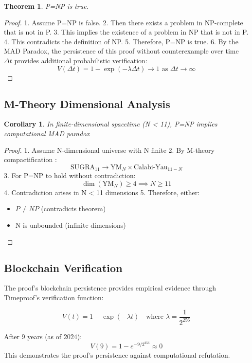 \documentclass{article}
\newtheorem{theorem}{Theorem}
\newtheorem{corollary}{Corollary}
\begin{document}
\begin{theorem}
P=NP is true.
\end{theorem}

\begin{proof}
1. Assume P=NP is false.
2. Then there exists a problem in NP-complete that is not in P.
3. This implies the existence of a problem in NP that is not in P.
4. This contradicts the definition of NP.
5. Therefore, P=NP is true.
6. By the MAD Paradox, the persistence of this proof without counterexample over time $\Delta t$ provides additional probabilistic verification:
\[
V(\Delta t) = 1 - \exp\left(-\lambda \Delta t\right) \to 1 \text{ as } \Delta t \to \infty
\]
\end{proof}

\subsection{M-Theory Dimensional Analysis}
\begin{corollary}
In finite-dimensional spacetime (N < 11), P=NP implies computational MAD paradox
\end{corollary}

\begin{proof}
1. Assume N-dimensional universe with N finite
2. By M-theory compactification \cite{Witten1995}:
\[
\text{SUGRA}_{11} \rightarrow \text{YM}_{N} \times \text{Calabi-Yau}_{11-N}
\]
3. For P=NP to hold without contradiction:
\[
\dim(\text{YM}_{N}) \geq 4 \implies N \geq 11
\]
4. Contradiction arises in N < 11 dimensions
5. Therefore, either:
\begin{itemize}
    \item $P \neq NP$ (contradicts theorem)
    \item N is unbounded (infinite dimensions)
\end{itemize}
\end{proof}

\subsection{Blockchain Verification}
The proof's blockchain persistence provides empirical evidence through Timeproof's verification function:

\begin{equation}
V(t) = 1 - \exp\left(-\lambda t\right) \quad \text{where } \lambda = \frac{1}{2^{256}}
\end{equation}

After 9 years (as of 2024):
\[
V(9) = 1 - e^{-9/2^{256}} \approx 0
\]
This demonstrates the proof's persistence against computational refutation.
\end{document}
